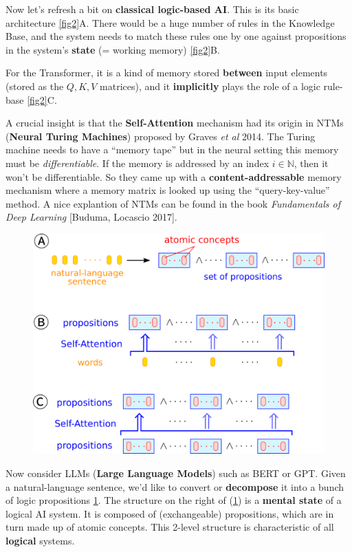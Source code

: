 \documentclass[runningheads]{llncs}
\newcommand{\circled}[1]{{\textcircled{\sffamily \scriptsize{#1}}}}
\begin{document}
Now let's refresh a bit on \textbf{classical logic-based AI}.  This is its basic architecture \ref{fig2}\circled{A}.  There would be a huge number of rules in the Knowledge Base, and the system needs to match these rules one by one against propositions in the system's \textbf{state} (= working memory) \ref{fig2}\circled{B}.

For the Transformer, it is a kind of memory stored \textbf{between} input elements (stored as the $Q, K, V$ matrices), and it \textbf{implicitly} plays the role of a logic rule-base \ref{fig2}\circled{C}.

A crucial insight is that the \textbf{Self-Attention} mechanism had its origin in NTMs (\textbf{Neural Turing Machines}) proposed by Graves \textit{et al} 2014.  The Turing machine needs to have a ``memory tape'' but in the neural setting this memory must be \textit{differentiable}.  If the memory is addressed by an index $i \in \mathbb{N}$, then it won't be differentiable.  So they came up with a \textbf{content-addressable} memory mechanism where a memory matrix is looked up using the ``query-key-value'' method.  A nice explantion of NTMs can be found in the book \textit{Fundamentals of Deep Learning} [Buduma, Locascio 2017].

\begin{figure}[h]
	\includegraphics[scale=0.6]{fig3.png}
	\caption{}
	\label{fig3}
\end{figure}

Now consider LLMs (\textbf{Large Language Models}) such as BERT or GPT.  Given a natural-language sentence, we'd like to convert or \textbf{decompose} it into a bunch of logic propositions \ref{fig3}.  The structure on the right of (\ref{fig3}) is a \textbf{mental state} of a logical AI system.  It is composed of (exchangeable) propositions, which are in turn made up of atomic concepts.  This 2-level structure is characteristic of all \textbf{logical} systems.
\end{document}
